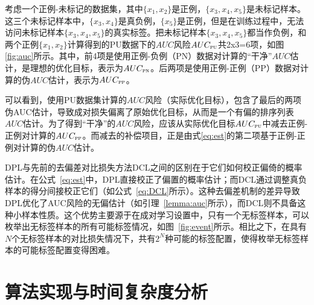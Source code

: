 考虑一个正例-未标记的数据集，其中$\{x_1, x_2\}$是正例，$\{x_3, x_4, x_5\}$是未标记样本。这三个未标记样本中，$\{x_3, x_4\}$是真负例，$\{x_5\}$是正例，但是在训练过程中，无法访问未标记样本$\{x_3, x_4, x_5\}$的真实标签。把未标记样本$\{x_3, x_4, x_5\}$都当作负例，和两个正例$\{x_1, x_2\}$计算得到的PU数据下的$AUC$风险$AUC_\textsc{pu}$共2x3=6项，如图\ref{fig:auc}所示。其中，前4项是使用正例-负例（PN）数据对计算的“干净”$AUC$估计，是理想的优化目标，表示为$AUC_\textsc{pn}$。后两项是使用正例-正例（PP）数据对计算的伪$AUC$估计，表示为$AUC_\textsc{pp}$。

可以看到，使用PU数据集计算的$AUC$风险（实际优化目标），包含了最后的两项伪AUC估计，导致成对损失偏离了原始优化目标，从而是一个有偏的排序列表$AUC$估计。为了得到“干净”的$AUC$风险，应该从实际优化目标$AUC_\textsc{pu}$中减去正例-正例对计算的$AUC_\textsc{pp}$。而减去的补偿项目，正是由式\eqref{eq:est}的第二项基于正例-正例对计算的伪$AUC$估计。



DPL与先前的去偏差对比损失方法DCL\cite{Chuang:2020:NIPS}之间的区别在于它们如何校正偏倚的概率估计。在公式~\eqref{eq:est}中，DPL直接校正了偏置的概率估计；而DCL通过调整真负样本的得分间接校正它们（如公式~\eqref{eq:DCL}所示）。这种去偏差机制的差异导致DPL优化了AUC风险的无偏估计（如引理~\ref{lemma:auc}所示），而DCL\cite{Chuang:2020:NIPS}则不具备这种小样本性质。这个优势主要源于在成对学习设置中，只有一个无标签样本，可以枚举出无标签样本的所有可能标签情况，如图~\ref{fig:event}所示。相比之下，在具有$N$个无标签样本的对比损失情况下，共有$2^N$种可能的标签配置，使得枚举无标签样本的可能标签配置变得困难。
\section{算法实现与时间复杂度分析}
